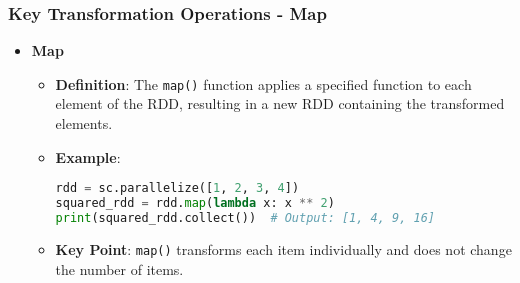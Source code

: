 \documentclass{beamer}
\begin{document}
\begin{frame}[fragile]
    \frametitle{Key Transformation Operations - Map}
    \begin{itemize}
        \item \textbf{Map}
            \begin{itemize}
                \item \textbf{Definition}: The \texttt{map()} function applies a specified function to each element of the RDD, resulting in a new RDD containing the transformed elements.
                \item \textbf{Example}:
                    \begin{lstlisting}[language=Python]
rdd = sc.parallelize([1, 2, 3, 4])
squared_rdd = rdd.map(lambda x: x ** 2)
print(squared_rdd.collect())  # Output: [1, 4, 9, 16]
                    \end{lstlisting}
                \item \textbf{Key Point}: \texttt{map()} transforms each item individually and does not change the number of items.
            \end{itemize}
    \end{itemize}
\end{frame}
\end{document}
